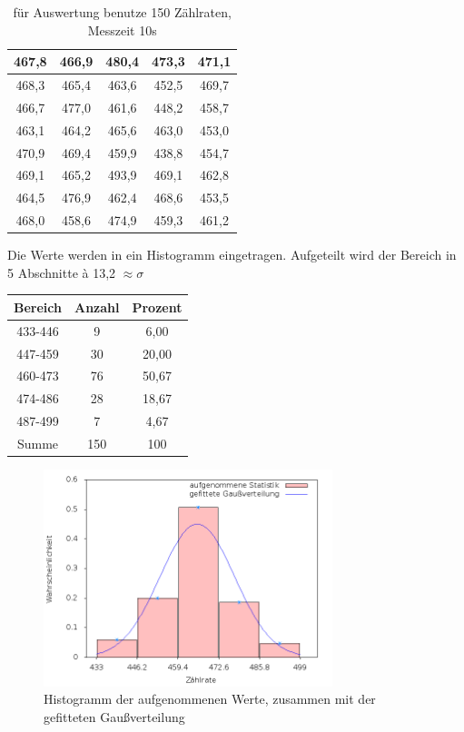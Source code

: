 \begin{table}[H]
\begin{tabular}{|c|c|c|c|c|}
467,8	&466,9	&480,4	&473,3	&471,1\\ \hline
468,3	&465,4	&463,6	&452,5	&469,7\\ \hline
466,7	&477,0	&461,6	&448,2	&458,7\\ \hline
463,1	&464,2	&465,6	&463,0	&453,0\\ \hline
470,9	&469,4	&459,9	&438,8	&454,7\\ \hline
469,1	&465,2	&493,9	&469,1	&462,8\\ \hline
464,5	&476,9	&462,4	&468,6	&453,5\\ \hline
468,0	&458,6	&474,9	&459,3	&461,2\\ \hline 
\end{tabular} 
\caption{für Auswertung benutze 150 Zählraten, Messzeit 10s}
\label{tab_zaehlraten}
\end{table}

Die Werte werden in ein Histogramm eingetragen. Aufgeteilt wird der Bereich in 5 Abschnitte à 13,2 $\approx \sigma$
\begin{table}[H]
\begin{tabular}{c|c|c|}
Bereich	&Anzahl&	Prozent\\ \hline 
433-446	&9	&6,00\\ \hline
447-459	&30	&20,00\\ \hline
460-473	&76	&50,67\\ \hline
474-486	&28	&18,67\\ \hline
487-499	&7	&4,67\\ \hline\hline
Summe	&150	&100  
\end{tabular} 
\end{table}

\begin{figure}[H]
\includegraphics[width=0.75\textwidth]{pics/Gauss.png}
\caption{Histogramm der aufgenommenen Werte, zusammen mit der gefitteten Gaußverteilung}
\end{figure}

